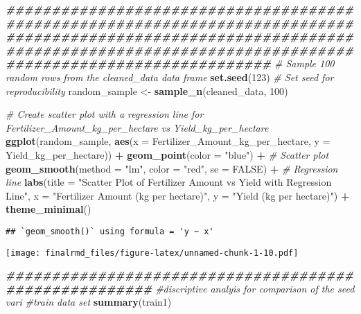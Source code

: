 \documentclass[
]{article}
\newenvironment{Shaded}{\begin{snugshade}}{\end{snugshade}}
\newcommand{\AttributeTok}[1]{\textcolor[rgb]{0.13,0.29,0.53}{#1}}
\newcommand{\CommentTok}[1]{\textcolor[rgb]{0.56,0.35,0.01}{\textit{#1}}}
\newcommand{\ConstantTok}[1]{\textcolor[rgb]{0.56,0.35,0.01}{#1}}
\newcommand{\DecValTok}[1]{\textcolor[rgb]{0.00,0.00,0.81}{#1}}
\newcommand{\DocumentationTok}[1]{\textcolor[rgb]{0.56,0.35,0.01}{\textbf{\textit{#1}}}}
\newcommand{\FunctionTok}[1]{\textcolor[rgb]{0.13,0.29,0.53}{\textbf{#1}}}
\newcommand{\NormalTok}[1]{#1}
\newcommand{\OtherTok}[1]{\textcolor[rgb]{0.56,0.35,0.01}{#1}}
\newcommand{\SpecialCharTok}[1]{\textcolor[rgb]{0.81,0.36,0.00}{\textbf{#1}}}
\newcommand{\StringTok}[1]{\textcolor[rgb]{0.31,0.60,0.02}{#1}}
\begin{document}
\begin{Shaded}
\begin{Highlighting}[]
\DocumentationTok{\#\#\#\#\#\#\#\#\#\#\#\#\#\#\#\#\#\#\#\#\#\#\#\#\#\#\#\#\#\#\#\#\#\#\#\#\#\#\#\#\#\#\#\#\#\#\#\#\#\#\#\#\#\#\#\#\#\#\#\#\#\#\#\#\#\#\#\#\#\#\#\#\#\#\#\#\#\#\#\#\#\#\#\#\#\#\#\#\#\#\#\#\#\#\#\#\#\#\#\#\#\#\#\#\#\#\#\#\#\#\#\#\#\#\#\#\#\#\#\#\#\#\#\#\#\#\#\#\#\#\#\#\#\#\#\#\#\#\#\#\#\#\#\#\#\#\#\#\#\#\#\#\#\#\#\#\#\#\#\#\#\#\#\#\#\#\#\#\#\#\#\#\#\#\#\#\#\#\#\#\#}
\CommentTok{\# Sample 100 random rows from the cleaned\_data data frame}
\FunctionTok{set.seed}\NormalTok{(}\DecValTok{123}\NormalTok{) }\CommentTok{\# Set seed for reproducibility}
\NormalTok{random\_sample }\OtherTok{\textless{}{-}} \FunctionTok{sample\_n}\NormalTok{(cleaned\_data, }\DecValTok{100}\NormalTok{)}

\CommentTok{\# Create scatter plot with a regression line for Fertilizer\_Amount\_kg\_per\_hectare vs Yield\_kg\_per\_hectare}
\FunctionTok{ggplot}\NormalTok{(random\_sample, }\FunctionTok{aes}\NormalTok{(}\AttributeTok{x =}\NormalTok{ Fertilizer\_Amount\_kg\_per\_hectare, }\AttributeTok{y =}\NormalTok{ Yield\_kg\_per\_hectare)) }\SpecialCharTok{+}
  \FunctionTok{geom\_point}\NormalTok{(}\AttributeTok{color =} \StringTok{"blue"}\NormalTok{) }\SpecialCharTok{+} \CommentTok{\# Scatter plot}
  \FunctionTok{geom\_smooth}\NormalTok{(}\AttributeTok{method =} \StringTok{"lm"}\NormalTok{, }\AttributeTok{color =} \StringTok{"red"}\NormalTok{, }\AttributeTok{se =} \ConstantTok{FALSE}\NormalTok{) }\SpecialCharTok{+} \CommentTok{\# Regression line}
  \FunctionTok{labs}\NormalTok{(}\AttributeTok{title =} \StringTok{"Scatter Plot of Fertilizer Amount vs Yield with Regression Line"}\NormalTok{,}
       \AttributeTok{x =} \StringTok{"Fertilizer Amount (kg per hectare)"}\NormalTok{,}
       \AttributeTok{y =} \StringTok{"Yield (kg per hectare)"}\NormalTok{) }\SpecialCharTok{+}
  \FunctionTok{theme\_minimal}\NormalTok{()}
\end{Highlighting}
\end{Shaded}

\begin{verbatim}
## `geom_smooth()` using formula = 'y ~ x'
\end{verbatim}

\texttt{[image: finalrmd\_files/figure-latex/unnamed-chunk-1-10.pdf]}

\begin{Shaded}
\begin{Highlighting}[]
\DocumentationTok{\#\#\#\#\#\#\#\#\#\#\#\#\#\#\#\#\#\#\#\#\#\#\#\#\#\#\#\#\#\#\#\#\#\#\#\#\#\#\#\#\#\#\#\#\#\#\#\#\#\#\#\#\#\#}
\CommentTok{\#discriptive analyis for comparison of the seed vari}
\CommentTok{\#train data set}
\FunctionTok{summary}\NormalTok{(train1)}
\end{Highlighting}
\end{Shaded}
\end{document}
